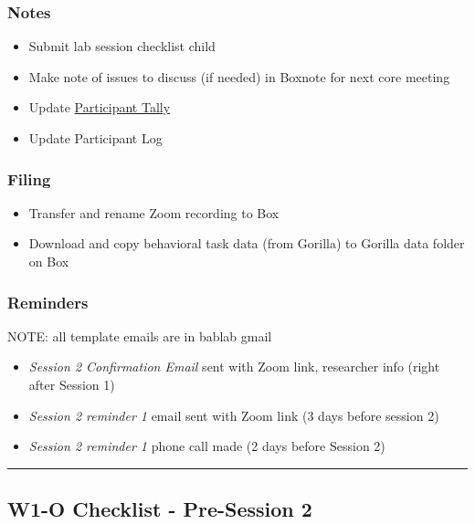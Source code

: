 \documentclass[]{book}
\providecommand{\tightlist}{%
  \setlength{\itemsep}{0pt}\setlength{\parskip}{0pt}}
\begin{document}
\hypertarget{notes-1}{%
\subsubsection{Notes}\label{notes-1}}

\begin{itemize}
\tightlist
\item
  Submit lab session checklist child
\item
  Make note of issues to discuss (if needed) in Boxnote for next core meeting
\item
  Update \href{https://ucla.app.box.com/file/724688028024}{Participant Tally}
\item
  Update Participant Log
\end{itemize}

\hypertarget{filing-2}{%
\subsubsection{Filing}\label{filing-2}}

\begin{itemize}
\tightlist
\item
  Transfer and rename Zoom recording to Box
\item
  Download and copy behavioral task data (from Gorilla) to Gorilla data folder on Box
\end{itemize}

\hypertarget{reminders-1}{%
\subsubsection{Reminders}\label{reminders-1}}

NOTE: all template emails are in bablab gmail

\begin{itemize}
\tightlist
\item
  \emph{Session 2 Confirmation Email} sent with Zoom link, researcher info (right after Session 1)
\item
  \emph{Session 2 reminder 1} email sent with Zoom link (3 days before session 2)
\item
  \emph{Session 2 reminder 1} phone call made (2 days before Session 2)
\end{itemize}

\begin{center}\rule{0.5\linewidth}{0.5pt}\end{center}

\hypertarget{w1-o-checklist---pre-session-2}{%
\subsection{W1-O Checklist - Pre-Session 2}\label{w1-o-checklist---pre-session-2}}
\end{document}
